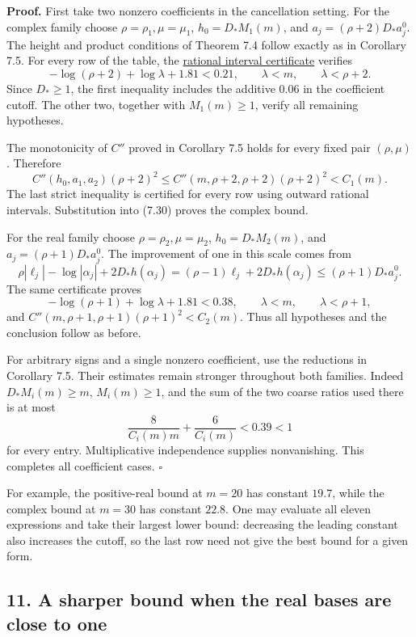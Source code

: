 \documentclass[
  11pt,
  a4paper,
]{article}
\begin{document}
\textbf{Proof.} First take two nonzero coefficients in the cancellation
setting. For the complex family choose \(\rho=\rho_1,\mu=\mu_1\),
\(h_0=D_*M_1(m)\), and \(a_j=(\rho+2)D_*a_j^0\). The height and product
conditions of Theorem 7.4 follow exactly as in Corollary 7.5. For every
row of the table, the
\href{https://kokunoyumeto.github.io/open-math-courses-public/courses/TR-BAKER/verification/laurent_families.py}{rational interval
certificate} verifies \[
-\log(\rho+2)+\log\lambda+1.81<0.21,\qquad
\lambda<m,\qquad \lambda<\rho+2.
\] Since \(D_*\ge1\), the first inequality includes the additive
\(0.06\) in the coefficient cutoff. The other two, together with
\(M_1(m)\ge1\), verify all remaining hypotheses.

The monotonicity of \(C''\) proved in Corollary 7.5 holds for every
fixed pair \((\rho,\mu)\). Therefore \[
C''(h_0,a_1,a_2)(\rho+2)^2
\le C''(m,\rho+2,\rho+2)(\rho+2)^2<C_1(m).
\] The last strict inequality is certified for every row using outward
rational intervals. Substitution into (7.30) proves the complex bound.

For the real family choose \(\rho=\rho_2,\mu=\mu_2\), \(h_0=D_*M_2(m)\),
and \(a_j=(\rho+1)D_*a_j^0\). The improvement of one in this scale comes
from \[
\rho|\ell_j|-\log|\alpha_j|+2D_*h(\alpha_j)
=(\rho-1)\ell_j+2D_*h(\alpha_j)
\le(\rho+1)D_*a_j^0.
\] The same certificate proves \[
-\log(\rho+1)+\log\lambda+1.81<0.38,\qquad
\lambda<m,\qquad \lambda<\rho+1,
\] and \(C''(m,\rho+1,\rho+1)(\rho+1)^2<C_2(m)\). Thus all hypotheses
and the conclusion follow as before.

For arbitrary signs and a single nonzero coefficient, use the reductions
in Corollary 7.5. Their estimates remain stronger throughout both
families. Indeed \(D_*M_i(m)\ge m\), \(M_i(m)\ge1\), and the sum of the
two coarse ratios used there is at most \[
\frac{8}{C_i(m)m}+\frac{6}{C_i(m)}<0.39<1
\] for every entry. Multiplicative independence supplies nonvanishing.
This completes all coefficient cases. \(\square\)

For example, the positive-real bound at \(m=20\) has constant \(19.7\),
while the complex bound at \(m=30\) has constant \(22.8\). One may
evaluate all eleven expressions and take their largest lower bound:
decreasing the leading constant also increases the cutoff, so the last
row need not give the best bound for a given form.

\subsection{11. A sharper bound when the real bases are close to
one}\label{a-sharper-bound-when-the-real-bases-are-close-to-one}
\end{document}
